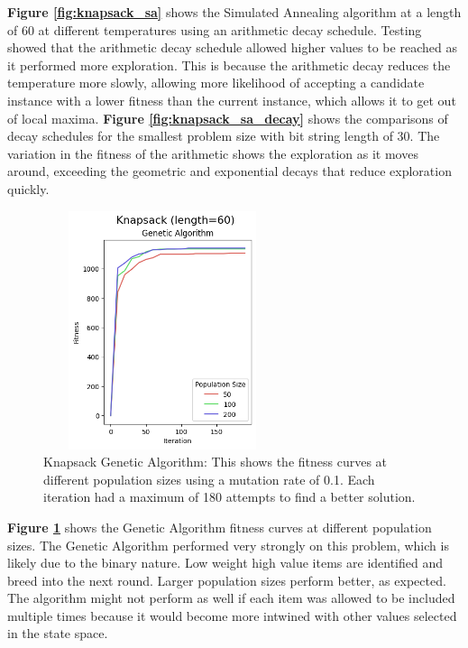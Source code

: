 \documentclass[letterpaper]{article} %
\begin{document}
\textbf{Figure \ref{fig:knapsack_sa}} shows the Simulated Annealing algorithm at a length of 60 at different temperatures using an arithmetic decay schedule.  Testing showed that the arithmetic decay schedule allowed higher values to be reached as it performed more exploration.  This is because the arithmetic decay reduces the temperature more slowly, allowing more likelihood of accepting a candidate instance with a lower fitness than the current instance, which allows it to get out of local maxima.  \textbf{Figure \ref{fig:knapsack_sa_decay}} shows the comparisons of decay schedules for the smallest problem size with bit string length of 30.  The variation in the fitness of the arithmetic shows the exploration as it moves around, exceeding the geometric and exponential decays that reduce exploration quickly.

\begin{figure}[htb]
\centering
\includegraphics[width=2.75in, height=2.75in]{figures/Knapsack_length=60_Genetic_Algorithm_l_60_ma_60_p_50__100__200_mu_0.1_.png}
\caption{Knapsack Genetic Algorithm: This shows the fitness curves at different population sizes using a mutation rate of 0.1. Each iteration had a maximum of 180 attempts to find a better solution. }
\label{fig:knapsack_ga}
\end{figure}

\textbf{Figure \ref{fig:knapsack_ga}} shows the Genetic Algorithm fitness curves at different population sizes.  The Genetic Algorithm performed very strongly on this problem, which is likely due to the binary nature.  Low weight high value items are identified and breed into the next round.  Larger population sizes perform better, as expected.  The algorithm might not perform as well if each item was allowed to be included multiple times because it would become more intwined with other values selected in the state space.
\end{document}
